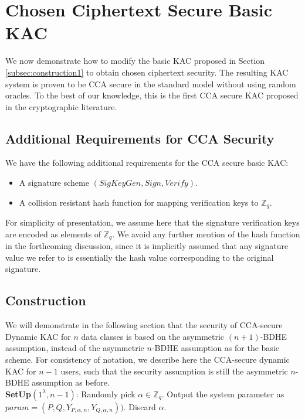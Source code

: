 \section{Chosen Ciphertext Secure Basic KAC}
\label{sec:CCA}

We now demonstrate how to modify the basic KAC proposed in Section \ref{subsec:construction1} to obtain chosen ciphertext security. The resulting KAC system is proven to be CCA secure in the standard model without using random oracles. To the best of our knowledge, this is the first CCA secure KAC proposed in the cryptographic literature.

\subsection{Additional Requirements for CCA Security}
\label{subsec:additional}

We have the following additional requirements for the CCA secure basic KAC:

\begin{itemize}
 \item A signature scheme $(SigKeyGen,Sign,Verify)$. 
 \item A collision resistant hash function for mapping verification keys to $\mathbb{Z}_q$. 
\end{itemize}

For simplicity of presentation, we assume here that the signature verification keys are encoded as elements of $\mathbb{Z}_q$. We avoid any further mention of the hash function in the forthcoming discussion, since it is implicitly assumed that any signature value we refer to is essentially the hash value corresponding to the original signature.

\subsection{Construction}
\label{subsec:construction_CCA}

We will demonstrate in the following section that the security of CCA-secure Dynamic KAC for $n$ data classes is based on the asymmetric $(n+1)$-BDHE assumption, instead of the asymmetric $n$-BDHE assumption as for the basic scheme. For consistency of notation, we describe here the CCA-secure dynamic KAC for $n-1$ users, such that the security assumption is still the asymmetric $n$-BDHE assumption as before. \\

 \noindent \textbf{SetUp}$(1^{\lambda},n-1)$: Randomly pick $\alpha \in \mathbb{Z}_q$. Output the system parameter as $param = (P,Q,Y_{P,\alpha,n},Y_{Q,\alpha,n}))$. Discard $\alpha$.
 
